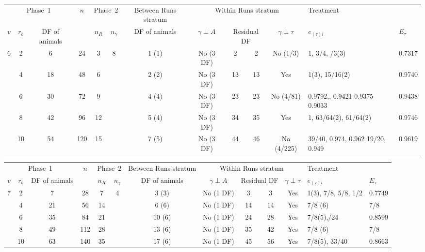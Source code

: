 \documentclass[a4paper,11pt]{article}
\begin{document}
\begin{landscape}
\begin{tabular}[t]{|c|c|c|c|c|c|c|c|c|c|c|p{1in}|p{0.4in}|} \hline
\multicolumn{3}{|c|}{Phase~1}  & $n$  & \multicolumn{2}{c|}{Phase~2} & Between Runs stratum  & \multicolumn{4}{c|}{Within Runs stratum} & \multicolumn{2}{p{1.4in}|}{Treatment} \\ \cline{1-3} \cline{5-6}\cline{7-13}
$v$ & $r_b$ & DF of animals &  & $n_R$ & $n_\gamma$ & DF of animals &  $\gamma \perp A$ & \multicolumn{2}{c|}{Residual DF} & $\gamma \perp \tau$ & $e_{(\tau)i}$ &$E_\tau$\\ \hline
6 & 2 & 6 & 24 & 3 & 8 & 1 (1) & No (3 DF) & 2 & 2 & No (1/3) & 1, 3/4, \newline 2/3(3)  & 0.7317 \\ \hline 
 & 4 & 18 & 48 & 6 &  & 2 (2) & No (3 DF) & 13 & 13 & Yes & 1(3), 15/16(2) & 0.9740 \\ \hline 
 & 6 & 30 & 72 & 9 &  & 4 (4) & No (3 DF) & 23 & 23 & No (4/81) & 0.9792,\newline 0.9601, 0.9421 0.9375 0.9033 & 0.9438\newline  \\ \hline 
 & 8 & 42 & 96 & 12 &  & 5 (4) & No (3 DF) & 34 & 35 & Yes & 1, 63/64(2), 61/64(2)  & 0.9746 \\ \hline 
 & 10 & 54 & 120 & 15 &  & 7 (5) & No (3 DF) & 44 & 46 & No (4/225) & 39/40, 0.974, 0.962 19/20, 0.949 & 0.9619 \\ \hline 
\end{tabular}



\begin{tabular}[t]{|c|c|c|c|c|c|c|c|c|c|c|p{1in}|p{0.4in}|} \hline
\multicolumn{3}{|c|}{Phase~1}  & $n$  & \multicolumn{2}{c|}{Phase~2} & Between Runs stratum  & \multicolumn{4}{c|}{Within Runs stratum} & \multicolumn{2}{p{1.4in}|}{Treatment} \\ \cline{1-3} \cline{5-6}\cline{7-13}
$v$ & $r_b$ & DF of animals &  & $n_R$ & $n_\gamma$ & DF of animals &  $\gamma \perp A$ & \multicolumn{2}{c|}{Residual DF} & $\gamma \perp \tau$ & $e_{(\tau)i}$ &$E_\tau$\\ \hline
7 & 2 & 7 & 28 & 7 & 4 & 3 (3) & No (1 DF) & 3 & 3 & Yes & 1(3), 7/8, 5/8, 1/2 & 0.7749 \\ \hline 
 & 4 & 21 & 56 & 14 &  & 6 (6) & No (1 DF) & 14 & 14 & Yes & 7/8 (6) & 7/8 \\ \hline 
 & 6 & 35 & 84 & 21 &  & 10 (6) & No (1 DF) & 24 & 28 & Yes & 7/8(5),\newline 19/24 & 0.8599 \\ \hline 
 & 8 & 49 & 112 & 28 &  & 13 (6) & No (1 DF) & 35 & 42 & Yes & 7/8 (6) & 7/8 \\ \hline 
 & 10 & 63 & 140 & 35 &  & 17 (6) & No (1 DF) & 45 & 56 & Yes & 7/8(5), 33/40 & 0.8663 \\ \hline 
\end{tabular}



\end{landscape}
\end{document}
